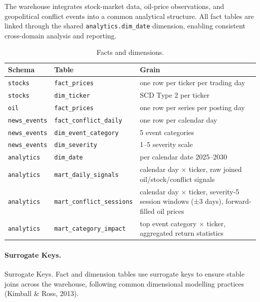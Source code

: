 \documentclass[11pt,a4paper]{article}
\begin{document}
The warehouse integrates stock-market data, oil-price observations,
and geopolitical conflict events into a common analytical structure.
All fact tables are linked through the shared
\texttt{analytics.dim\_date} dimension, enabling consistent
cross-domain analysis and reporting.

\begin{table}[H]
  \centering
  \caption{Facts and dimensions.}
  \label{tab:dw_facts_dims}
  \small
  \begin{tabularx}{\textwidth}{l l X}
    \toprule
    \textbf{Schema} & \textbf{Table} & \textbf{Grain} \\
    \midrule
    \texttt{stocks}      & \texttt{fact\_prices}   & one row per ticker per trading day \\
    \texttt{stocks}      & \texttt{dim\_ticker}    & SCD Type 2 per ticker \\
    \texttt{oil}         & \texttt{fact\_prices}   & one row per series per posting day \\
    \texttt{news\_events}& \texttt{fact\_conflict\_daily} & one row per calendar day \\
    \texttt{news\_events}& \texttt{dim\_event\_category} & 5 event categories \\
    \texttt{news\_events}& \texttt{dim\_severity}  & 1--5 severity scale \\
    \texttt{analytics}   & \texttt{dim\_date}      & per calendar date 2025--2030 \\
    \texttt{analytics}   & \texttt{mart\_daily\_signals}     & calendar day $\times$ ticker, raw joined oil/stock/conflict signals \\
    \texttt{analytics}   & \texttt{mart\_conflict\_sessions} & calendar day $\times$ ticker, severity-5 session windows (±3 days), forward-filled oil prices \\
    \texttt{analytics}   & \texttt{mart\_category\_impact}   & top event category $\times$ ticker, aggregated return statistics \\
    \bottomrule
  \end{tabularx}
\end{table}

\paragraph{Surrogate Keys.}
Surrogate Keys. Fact and dimension tables use surrogate keys to ensure
stable joins across the warehouse, following common dimensional
modelling practices (Kimball \& Ross, 2013).
\end{document}
